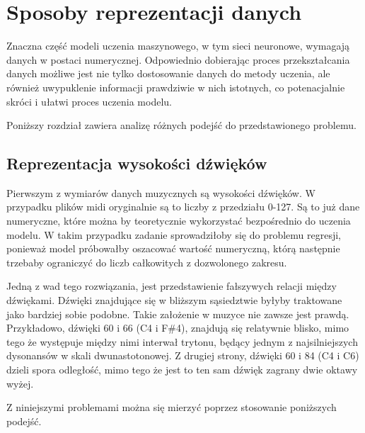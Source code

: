 \chapter{Sposoby reprezentacji danych}
{
    Znaczna część modeli uczenia maszynowego, w\,\,tym sieci neuronowe, wymagają 
    danych w\,\,postaci numerycznej. Odpowiednio dobierając proces przekształcania danych
    możliwe jest nie tylko dostosowanie danych do metody uczenia, ale również
    uwypuklenie informacji prawdziwie w\,\,nich istotnych, co potenacjalnie skróci i\,\,ułatwi proces uczenia modelu.

    Poniższy rozdział zawiera analizę różnych podejść do przedstawionego problemu.

    \section{Reprezentacja wysokości dźwięków}
    {
        Pierwszym z\,\,wymiarów danych muzycznych są wysokości dźwięków. W\,\,przypadku plików midi
        oryginalnie są to liczby z\,\,przedziału 0-127. Są to już dane numeryczne, które
        można by teoretycznie wykorzystać bezpośrednio do uczenia modelu.
        W\,\,takim przypadku zadanie sprowadziłoby się do problemu regresji, ponieważ model próbowałby
        oszacować wartość numeryczną, którą następnie trzebaby ograniczyć do liczb całkowitych z\,\,dozwolonego zakresu.

        Jedną z\,\,wad tego rozwiązania, jest przedstawienie fałszywych relacji między dźwiękami.
        Dźwięki znajdujące się w\,\,bliższym sąsiedztwie byłyby traktowane jako bardziej sobie podobne.
        Takie założenie w\,\,muzyce nie zawsze jest prawdą. Przykładowo, dźwięki 60 i\,\,66 (C4 i\,\,F\#4), znajdują się
        relatywnie blisko, mimo tego że występuje między nimi interwał trytonu, będący jednym z\,\,najsilniejszych dysonansów w\,\,skali 
        dwunastotonowej. Z\,\,drugiej strony, dźwięki 60 i\,\,84 (C4 i\,\,C6) dzieli spora odległość, mimo tego że jest to ten sam dźwięk
        zagrany dwie oktawy wyżej.

        Z\,\,niniejszymi problemami można się mierzyć poprzez stosowanie poniższych podejść.

}}
